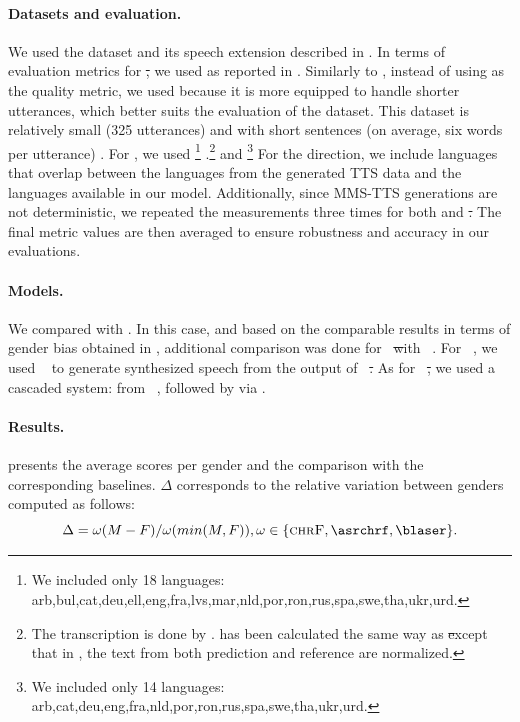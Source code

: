 \paragraph{Datasets and evaluation.} 
We used the \multilingualholisticbias dataset \citep{costa2023multilingual} and its speech extension described in \citet{SeamlessM4TArXiv}. In terms of evaluation metrics for \st,
we used \chrf as reported in .%
 Similarly to \citet{SeamlessM4TArXiv}, instead of using \bleu as the quality metric, we used \chrf because it is more equipped to handle shorter utterances, which better suits the evaluation of the \multilingualholisticbias dataset. This dataset is relatively small (325 utterances) and with short sentences (on average, six words per utterance) \citep{costa2023multilingual}. 
For \sst, we used \asrchrf \footnote{We included only 18 languages: arb,bul,cat,deu,ell,eng,fra,lvs,mar,nld,por,ron,rus,spa,swe,tha,ukr,urd.} .\footnote{The transcription is done by \whisperlarge. \chrf has been calculated the same way as \st except that in \sst, the text from both prediction and reference are normalized.} 
and \blaser \citep{SeamlessM4TArXiv} \footnote{We included only 14 languages: arb,cat,deu,eng,fra,nld,por,ron,rus,spa,swe,tha,ukr,urd.} For the \engx direction, we include languages that overlap between the languages from the generated TTS data and the languages available in our \sst model. 
Additionally, since MMS-TTS generations are not deterministic, we repeated the measurements three times for both \sst and \st. The final metric values are then averaged to ensure robustness and accuracy in our evaluations. 

\paragraph{Models.} We compared \mfourttwo with \mfourtlg. In this case, and based on the comparable results in terms of gender bias obtained in \citet{SeamlessM4TArXiv}, additional comparison was done for \xeng\ \st with \whisperlarge~\citep{whisper}. For \xeng\ \sst, we used \yourtts ~\citep{casanova2022yourtts} to generate synthesized speech from the output of \whisperlarge\ \st. As for \engx\ \st, we used a cascaded system: \asr from \whisperlarge~\citep{whisper}, followed by \mt via \nllbmedium \citep{nllb2022}. %

\paragraph{Results.}  presents the average scores per gender and the comparison with the corresponding baselines. $\Delta$ corresponds to the relative variation between genders computed as follows:
\begin{equation*}
\Delta = \omega(M-F)/\omega(min(M,F)), \omega \in \{ \textsc{chrF}, \asrchrf, \blaser \}.
\end{equation*}

